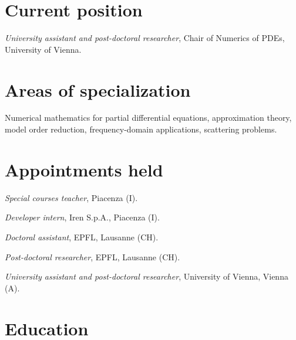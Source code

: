 \documentclass[11pt]{article} %
\begin{document}

\medskip %

\section*{Current position}

\emph{University assistant and post-doctoral researcher}, Chair of Numerics of PDEs, University of Vienna. %


\section*{Areas of specialization}

Numerical mathematics for partial differential equations, approximation theory, model order reduction, frequency-domain applications, scattering problems.


\section*{Appointments held}

\hspace{\parindent}\emph{Special courses teacher}, Piacenza (I).

\emph{Developer intern}, Iren S.p.A., Piacenza (I).

\emph{Doctoral assistant}, EPFL, Lausanne (CH).

\emph{Post-doctoral researcher}, EPFL, Lausanne (CH).

\emph{University assistant and post-doctoral researcher}, University of Vienna, Vienna (A).


\section*{Education}
\end{document}
